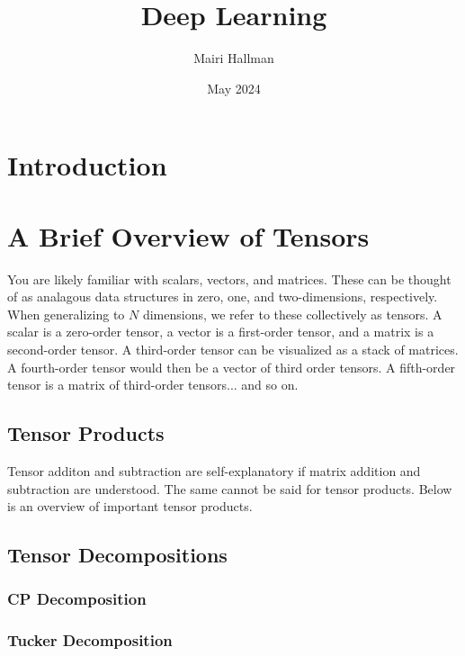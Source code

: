 \documentclass{article}
\title{Deep Learning}
\author{Mairi Hallman}
\date{May 2024}
\begin{document}
\maketitle

\section{Introduction}

\section{A Brief Overview of Tensors}

You are likely familiar with scalars, vectors, and matrices. These can be thought of as analagous data structures in zero, one, and two-dimensions, respectively. When generalizing to \(N\) dimensions, we refer to these collectively as tensors. A scalar is a zero-order tensor, a vector is a first-order tensor, and a matrix is a second-order tensor. A third-order tensor can be visualized as a stack of matrices. A fourth-order tensor would then be a vector of third order tensors. A fifth-order tensor is a matrix of third-order tensors... and so on.



\subsection{Tensor Products}

Tensor additon and subtraction are self-explanatory if matrix addition and subtraction are understood. The same cannot be said for tensor products. Below is an overview of important tensor products.


\subsection{Tensor Decompositions}

\subsubsection{CP Decomposition}

\subsubsection{Tucker Decomposition}
\end{document}
